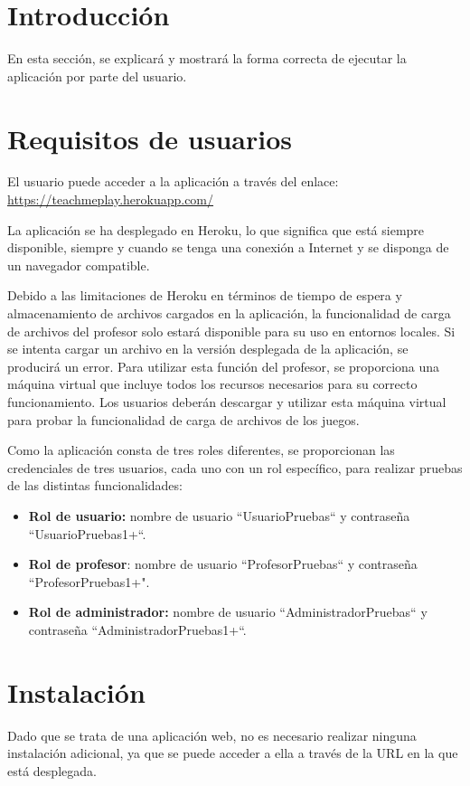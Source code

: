
\section{Introducción}
En esta sección, se explicará y mostrará la forma correcta de ejecutar la aplicación por parte del usuario.

\section{Requisitos de usuarios}
El usuario puede acceder a la aplicación a través del enlace: \url{https://teachmeplay.herokuapp.com/}

La aplicación se ha desplegado en Heroku, lo que significa que está siempre disponible, siempre y cuando se tenga una conexión a Internet y se disponga de un navegador compatible.

Debido a las limitaciones de Heroku en términos de tiempo de espera y almacenamiento de archivos cargados en la aplicación, la funcionalidad de carga de archivos del profesor solo estará disponible para su uso en entornos locales. Si se intenta cargar un archivo en la versión desplegada de la aplicación, se producirá un error.
Para utilizar esta función del profesor, se proporciona una máquina virtual que incluye todos los recursos necesarios para su correcto funcionamiento. Los usuarios deberán descargar y utilizar esta máquina virtual para probar la funcionalidad de carga de archivos de los juegos.

Como la aplicación consta de tres roles diferentes, se proporcionan las credenciales de tres usuarios, cada uno con un rol específico, para realizar pruebas de las distintas funcionalidades:
\begin{itemize}
    \item \textbf{Rol de usuario:} nombre de usuario ``UsuarioPruebas`` y contraseña ``UsuarioPruebas1+``.
    \item \textbf{Rol de profesor}: nombre de usuario ``ProfesorPruebas`` y contraseña ``ProfesorPruebas1+".
    \item \textbf{Rol de administrador:} nombre de usuario ``AdministradorPruebas`` y contraseña ``AdministradorPruebas1+``.
\end{itemize}

\section{Instalación}
Dado que se trata de una aplicación web, no es necesario realizar ninguna instalación adicional, ya que se puede acceder a ella a través de la URL en la que está desplegada.

